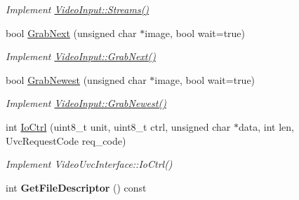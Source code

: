 \begin{DoxyCompactItemize}
\begin{DoxyCompactList}\small\item\em Implement \hyperlink{structpangolin_1_1_video_input_a9030d775d699c39ab7b7ba378c007c6a}{Video\+Input\+::\+Streams()} \end{DoxyCompactList}\item 
bool \hyperlink{classpangolin_1_1_v4l_video_aafe3a421c858ab11f170e28ee2a61b61}{Grab\+Next} (unsigned char $\ast$image, bool wait=true)\hypertarget{classpangolin_1_1_v4l_video_aafe3a421c858ab11f170e28ee2a61b61}{}\label{classpangolin_1_1_v4l_video_aafe3a421c858ab11f170e28ee2a61b61}

\begin{DoxyCompactList}\small\item\em Implement \hyperlink{structpangolin_1_1_video_input_ad3d8ff59c1ec4139320097e6e1111f32}{Video\+Input\+::\+Grab\+Next()} \end{DoxyCompactList}\item 
bool \hyperlink{classpangolin_1_1_v4l_video_a3f9c35ccd4a248000cc25c27245d0c75}{Grab\+Newest} (unsigned char $\ast$image, bool wait=true)\hypertarget{classpangolin_1_1_v4l_video_a3f9c35ccd4a248000cc25c27245d0c75}{}\label{classpangolin_1_1_v4l_video_a3f9c35ccd4a248000cc25c27245d0c75}

\begin{DoxyCompactList}\small\item\em Implement \hyperlink{structpangolin_1_1_video_input_a4c8ac38e3c6a3f591663aeebf645e4c6}{Video\+Input\+::\+Grab\+Newest()} \end{DoxyCompactList}\item 
int \hyperlink{classpangolin_1_1_v4l_video_aa5ab2d91f3230a73ed21483874e2bbd0}{Io\+Ctrl} (uint8\+\_\+t unit, uint8\+\_\+t ctrl, unsigned char $\ast$data, int len, Uvc\+Request\+Code req\+\_\+code)\hypertarget{classpangolin_1_1_v4l_video_aa5ab2d91f3230a73ed21483874e2bbd0}{}\label{classpangolin_1_1_v4l_video_aa5ab2d91f3230a73ed21483874e2bbd0}

\begin{DoxyCompactList}\small\item\em Implement Video\+Uvc\+Interface\+::\+Io\+Ctrl() \end{DoxyCompactList}\item 
int {\bfseries Get\+File\+Descriptor} () const \hypertarget{classpangolin_1_1_v4l_video_a609e194ebb94cf48904e94b01cfdf6e2}{}\label{classpangolin_1_1_v4l_video_a609e194ebb94cf48904e94b01cfdf6e2}

\end{DoxyCompactItemize}
